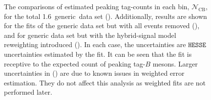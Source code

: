 \begin{figure}[hbtp!]
    \caption{\label{fig:mc_fit_yield_comparisons}The comparisons of estimated peaking tag-\B counts in each \EB bin, $\mathcal{N}_{\mathrm{CB}}$,
    for the total 1.6~\invab generic~\MC data set ().
    Additionally, results are shown for the fits of the generic \MC data set but with all \BtoXsgamma events removed (),
    and for generic \MC data set but with the hybrid-signal model reweighting introduced ().
    In each case, the uncertainties are $\texttt{HESSE}$ uncertainties estimated by the fit.
    It can be seen that the fit is receptive to the expected count of peaking tag-$B$ mesons.
    Larger uncertainties in () are due to known issues in weighted error estimation.
    They do not affect this analysis as weighted fits are not performed later.
    }
\end{figure}